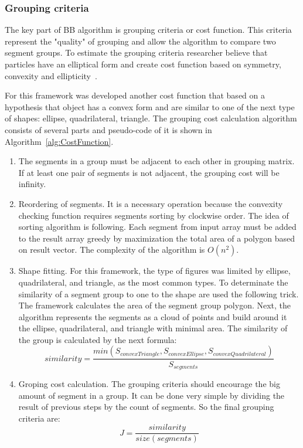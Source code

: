 \documentclass{lutmscthesis}[2010/09/22]
\begin{document}
\subsubsection{Grouping criteria}

The key part of BB algorithm is grouping criteria or cost function. This criteria represent the "quality" of grouping and allow the algorithm to compare two segment groups. To estimate the grouping criteria researcher believe that particles have an elliptical form and create cost function based on symmetry, convexity and ellipticity~\cite{zafari-bb}.

For this framework was developed another cost function that based on a hypothesis that object has a convex form and are similar to one of the next type of shapes: ellipse, quadrilateral, triangle. The grouping cost calculation algorithm consists of several parts and pseudo-code of it is shown in Algorithm~\ref{alg:CostFunction}.

\begin{enumerate}
    \item The segments in a group must be adjacent to each other in grouping matrix. If at least one pair of segments is not adjacent, the grouping cost will be infinity.
    \item  Reordering of segments. It is a necessary operation because the convexity checking function requires segments sorting by clockwise order. The idea of sorting algorithm is following. Each segment from input array must be added to the result array greedy by maximization the total area of a polygon based on result vector. The complexity of the algorithm is $O(n^2)$.
    \item Shape fitting. For this framework, the type of figures was limited by ellipse, quadrilateral, and triangle, as the most common types. To determinate the similarity of a segment group to one to the shape are used the following trick. The framework calculates the area of the segment group polygon. Next, the algorithm represents the segments as a cloud of points and build around it the ellipse, quadrilateral, and triangle with minimal area. The similarity of the group is calculated by the next formula: 
    \begin{equation}
        similarity = \frac{min(S_{convexTriangle},S_{convexEllipse},S_{convexQuadrilateral})}{S_{segments}}
        \label{eq:simularity cost}
    \end{equation}
    \item Groping cost calculation.  The grouping criteria should encourage the big amount of segment in a group. It can be done very simple by dividing the result of previous steps by the count of segments. So the final grouping criteria are:
    \begin{equation}
        J = \frac{similarity}{size(segments)}
    \label{eq:fullCost}
    \end{equation}
\end{enumerate}
\end{document}
